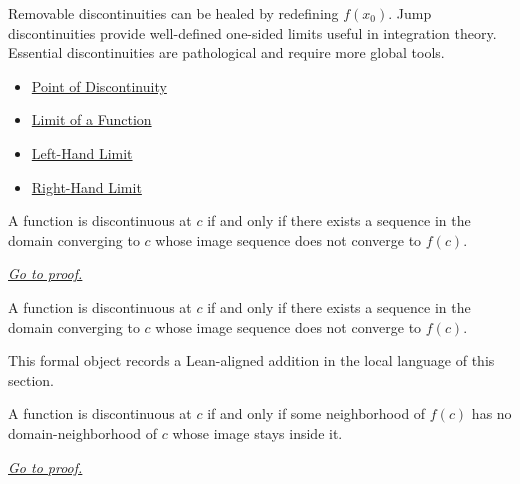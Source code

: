 \begin{remark*}[Interpretation]
Removable discontinuities can be healed by redefining $f(x_0)$. Jump discontinuities provide well-defined one-sided limits useful in integration theory. Essential discontinuities are pathological and require more global tools.
\end{remark*}

\begin{dependencies}
\begin{itemize}
  \item \hyperref[def:point-of-discontinuity]{Point of Discontinuity}
  \item \hyperref[def:limit-function]{Limit of a Function}
  \item \hyperref[def:left-hand-limit]{Left-Hand Limit}
  \item \hyperref[def:right-hand-limit]{Right-Hand Limit}
\end{itemize}
\end{dependencies}

\begin{theorem}
\label{thm:discontinuity-iff-sequential}
A function is discontinuous at $c$ if and only if there exists a sequence in the domain converging to $c$ whose image sequence does not converge to $f(c)$.

\smallskip
\noindent
\hyperref[prf:discontinuity-iff-sequential]{\textit{Go to proof.}}
\end{theorem}

\begin{remark*}
A function is discontinuous at $c$ if and only if there exists a sequence in the domain converging to $c$ whose image sequence does not converge to $f(c)$.
\end{remark*}

\begin{remark*}[Interpretation]
This formal object records a Lean-aligned addition in the local language of this section.
\end{remark*}

\begin{dependencies}
\NoLocalDependencies
\end{dependencies}
\begin{theorem}
\label{thm:discontinuity-iff-neighborhood}
A function is discontinuous at $c$ if and only if some neighborhood of $f(c)$ has no domain-neighborhood of $c$ whose image stays inside it.

\smallskip
\noindent
\hyperref[prf:discontinuity-iff-neighborhood]{\textit{Go to proof.}}
\end{theorem}

